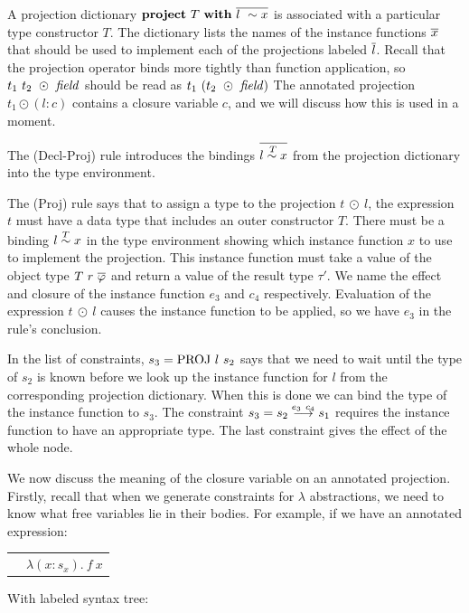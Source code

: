 A projection dictionary $\kproject \ T \ \kwith \ \ov{l \ \sim x}$ is associated with a particular type constructor $T$. The dictionary lists the names of the instance functions $\overline{x}$ that should be used to implement each of the projections labeled $\overline{l}$. Recall that the projection operator binds more tightly than function application, so $t_1 \ t_2 \ \odot \ \operatorname{\mathit{field}}$ should be read as $t_1 \ (t_2 \ \odot \ \operatorname{\mathit{field}})$ The annotated projection $t_1 \odot (l : c)$ contains a closure variable $c$, and we will discuss how this is used in a moment.

The (Decl-Proj) rule introduces the bindings $\overline{l \stackrel{\:T}{\sim} x}$ from the projection dictionary into the type environment.

The (Proj) rule says that to assign a type to the projection $t \ \odot \ l$, the expression $t$ must have a data type that includes an outer constructor $T$. There must be a binding $l \stackrel{T}{\sim} x$ in the type environment showing which instance function $x$ to use to implement the projection. This instance function must take a value of the object type $T \ r \ \ov{\varphi}$ and return a value of the result type $\tau'$. We name the effect and closure of the instance function $e_3$ and $c_4$ respectively. Evaluation of the expression $t \ \odot \ l$ causes the instance function to be applied, so we have $e_3$ in the rule's conclusion.

In the list of constraints, $s_3 = \rPROJ \ l \ s_2$ says that we need to wait until the type of $s_2$ is known before we look up the instance function for $l$ from the corresponding projection dictionary. When this is done we can bind the type of the instance function to $s_3$. The constraint $s_3 = s_2 \stackrel{e_3 \ c_4}{\longrightarrow} s_1$ requires the instance function to have an appropriate type. The last constraint gives the effect of the whole node.

We now discuss the meaning of the closure variable on an annotated projection. Firstly, recall that when we generate constraints for $\lambda$ abstractions, we need to know what free variables lie in their bodies. For example, if we have an annotated expression:

\qq\qq
\begin{tabular}{ll}
	& $\lambda (x : s_x). \ f \ x$	\\
\end{tabular}

With labeled syntax tree:

